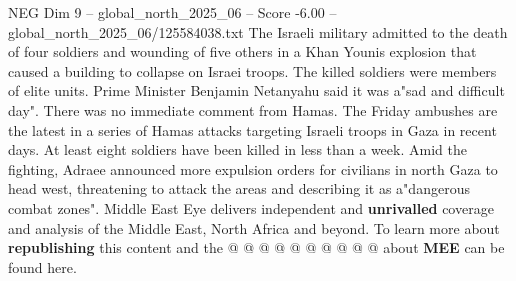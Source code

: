 \begin{textsample}{NEG Dim 9 – global\_north\_2025\_06 – Score -6.00 – global\_north\_2025\_06/125584038.txt}
The Israeli military admitted to the death of four soldiers and wounding of five others in a Khan Younis explosion that caused a building to collapse on Israei troops.
The killed soldiers were members of elite units.
Prime Minister Benjamin Netanyahu said it was a"sad and difficult day".
There was no immediate comment from Hamas.
The Friday ambushes are the latest in a series of Hamas attacks targeting Israeli troops in Gaza in recent days.
At least eight soldiers have been killed in less than a week.
Amid the fighting, Adraee announced more expulsion orders for civilians in north Gaza to head west, threatening to attack the areas and describing it as a"dangerous combat zones".
Middle East Eye delivers independent and \textbf{unrivalled} coverage and analysis of the Middle East, North Africa and beyond.
To learn more about \textbf{republishing} this content and the @ @ @ @ @ @ @ @ @ @ about \textbf{MEE} can be found here.

\end{textsample}
